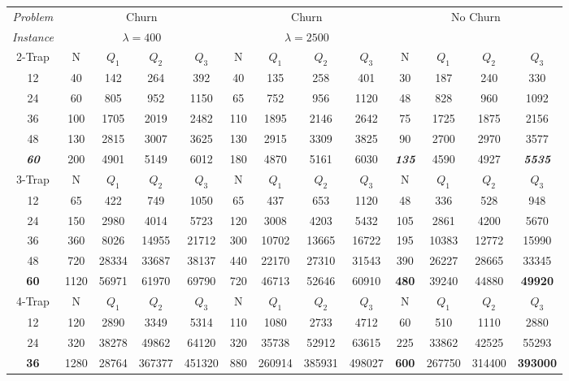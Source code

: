 \begin{sidewaystable}[htbp]
\centering
{\tiny
\begin{tabular}{c|c c c c|c c c c| c c c c|}

{\it Problem}&\multicolumn{4}{|c|}{Churn}&\multicolumn{4}{|c|}{Churn}&\multicolumn{4}{|c|}{No Churn}\\
{\it Instance}&\multicolumn{4}{|c|}{$\lambda = 400$}&\multicolumn{4}{|c|}{$\lambda = 2500$}&\multicolumn{4}{|c|}{ }\\
\hline
2-Trap&N&$Q_1$&$Q_2$&$Q_3$&N&$Q_1$&$Q_2$&$Q_3$&N&$Q_1$&$Q_2$&{\it {\bf $Q_3$}}\\
\hline
12&40 &142 &264 &392               &40 &135 &258 &401        &30&187&240&330\\
24&60 &805 &952 &1150               &65 &752 &956 &1120        &48&828&960&1092\\
36&100 &1705 &2019 &2482               &110 &1895 &2146 &2642        &75&1725&1875&2156\\ 
48&130 &2815 &3007 &3625               &130 &2915 &3309 &3825        &90&2700&2970&3577\\
{\it {\bf 60}}&200 &4901 &5149 &6012   &180 &4870 &5161 &6030        &{\it {\bf 135}}&4590&4927&{\it {\bf 5535}}\\
\hline
3-Trap&N&$Q_1$&$Q_2$&$Q_3$&N&$Q_1$&$Q_2$&$Q_3$&N&$Q_1$&$Q_2$&{\bf $Q_3$}\\
\hline
12 &65 &422 &749 &1050          &65 &437 &653 &1120           &48&336&528&948\\
24 &150 &2980 &4014 &5723          &120 &3008 &4203 &5432           &105&2861&4200&5670\\
36 &360 &8026 &14955 &21712          &300 &10702 &13665 &16722           &195&10383&12772&15990\\
48 &720 &28334 &33687 &38137          &440 &22170 &27310 &31543           &390&26227&28665&33345\\
{\bf 60}&1120 &56971 &61970 &69790     &720 &46713 &52646 &60910           &{\bf 480}&39240&44880&{\bf 49920}\\
\hline
4-Trap&N&$Q_1$&$Q_2$&$Q_3$&N&$Q_1$&$Q_2$&$Q_3$&N&$Q_1$&$Q_2$&{\bf $Q_3$}\\
\hline
12&120 &2890 &3349 &5314             &110 &1080 &2733 &4712           &60&510&1110&2880\\
24&320 &38278 &49862 &64120             &320 &35738 &52912 &63615           &225&33862&42525&55293\\
{\bf 36}&1280 &28764 &367377 &451320       &880 &260914 &385931 &498027           &{\bf 600}&267750&314400&{\bf 393000}\\
\hline

\end{tabular}
}
\caption{Test-Case 3: Number of evaluations to solution in $Q_1$, $Q_2$ and $Q_3$ for different trap functions and chromosome lengths $L$. Population sizes of the problem instances are estimated by bisection using a selectorecombinative GA.\label{table:numericalresultstestcase3}}
\end{sidewaystable}
